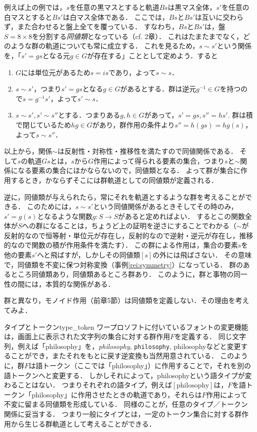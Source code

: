 \documentclass[11pt,a4paper, dvipdfmx]{jsarticle}
\begin{document}
例えば上の例では，$s$を任意の黒マスとすると軌道$Bs$は黒マス全体，$s'$を任意の白マスとすると$Bs'$は白マス全体である．
ここでは，$Bs$と$Bs'$は互いに交わらず，また合わせると盤上全てを覆っている．
すなわち，$Bs$と$Bs'$は，盤$S = 8 \times 8$を分割する\emph{同値類}となっている（cf. 2章）．
これはたまたまでなく，どのような群の軌道についても常に成立する．
これを見るため，$s \sim s'$という関係を，「$s' = gs$となる元$g \in G$が存在する」こととして定めよう．すると
\begin{enumerate}
 \item $G$には単位元があるため$s = is$であり，よって$s \sim s$．
 \item $s \sim s'$，つまり$s' = gs$となる$g \in G$があるとする．群は逆元$g^{-1} \in G$を持つので$s = g^{-1}s'$，よって$s' \sim s$．
 \item $s \sim s', s' \sim s''$とする．つまりある$g, h \in G$があって，$s' = gs, s'' = hs'$. 
       群は積で閉じているため$hg \in G$があり，群作用の条件より$s'' = h(gs) = hg(s)$，よって$s \sim s''$．
\end{enumerate}
以上から，関係$\sim$は反射性・対称性・推移性を満たすので同値関係である．
そして$s$の軌道$Gs$とは，$s$から$G$作用によって得られる要素の集合，つまり$s$と$\sim$関係になる要素の集合にほかならないので，同値類となる．
よって群が集合に作用するとき，かならずそこには群軌道としての同値類が定義される．

逆に，同値類が与えられたら，常にそれを軌道とするような群を考えることができる．
このためには，$s \sim s'$という同値関係があるときそしてその時のみ，$s' = g(s)$となるような関数$g:S \to S$があると定めればよい．
するとこの関数全体が$S$への群になることは，ちょうど上の証明を逆さにすることでわかる（$\sim$が反射的なので恒等射・単位元が存在し，反射的なので逆射・逆元が存在し，推移的なので関数の積が作用条件を満たす）．
この群による作用は，集合の要素$s$を他の要素$s'$へと飛ばすが，しかしその同値類$[s]$の外には飛ばさない．
その意味で，同値類を不変に保つ対称変換（事例\ref{rei:symmetry}）になっている．
群のあるところ同値類あり，同値類あるところ群あり．
このように，群と事物の同一性の間には，本質的な関係がある．

\begin{renshu}{}{}
 群と異なり，モノイド作用（前章5節）は同値類を定義しない．その理由を考えてみよ．
\end{renshu}

\begin{rei}{タイプとトークン}{type_token}
ワープロソフトに付いているフォントの変更機能は，画面上に表示された文字列の集合に対する群作用$F$を定義する．
同じ文字列，例えば「philosophy」を，\textit{philosophy}, \texttt{philosophy}, \textsf{philosophy}などと変更することができ，またそれをもとに戻す逆変換も当然用意されている．
このように，群$F$は語トークン（ここでは「philosophy」）に作用することで，それを別の語トークンへと変更する．
しかしそれによって，philosophyという語タイプが変わることはない．
つまりそれぞれの語タイプ，例えば$[\text{philosophy}]$は，$F$を語トークン「philosophy」に作用させたときの軌道であり，それらは$F$作用によって不変に留まる同値類を形成している．
同様のことが，任意のタイプ／トークン関係に妥当する．
つまり一般にタイプとは，一定のトークン集合に対する群作用から生じる群軌道として考えることができる．
\end{rei}
\end{document}
